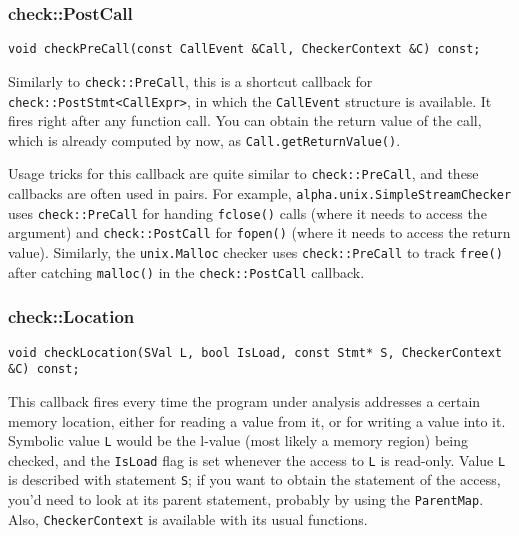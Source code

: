 \documentclass[a4paper,12pt]{article}
\newenvironment{nobr}{\begin{minipage}{\textwidth}\setlength\parskip{1em}
}{\end{minipage}\ignorespacesafterend}
\begin{document}
\begin{nobr}
\subsubsection{check::PostCall}

\begin{lstlisting}[style=cplusplus,numbers=none]
void checkPreCall(const CallEvent &Call, CheckerContext &C) const;
\end{lstlisting}

Similarly to \lstinline|check::PreCall|, this is a shortcut callback for \lstinline|check::PostStmt<CallExpr>|, in which the \lstinline|CallEvent| structure is available. It fires right after any function call. You can obtain the return value of the call, which is already computed by now, as \lstinline|Call.getReturnValue()|.
\end{nobr}

Usage tricks for this callback are quite similar to \lstinline|check::PreCall|, and these callbacks are often used in pairs. For example, \lstinline|alpha.unix.SimpleStreamChecker| uses \lstinline|check::PreCall| for handing \lstinline|fclose()| calls (where it needs to access the argument) and \lstinline|check::PostCall| for \lstinline|fopen()| (where it needs to access the return value). Similarly, the \lstinline|unix.Malloc| checker uses \lstinline|check::PreCall| to track \lstinline|free()| after catching \lstinline|malloc()| in the \lstinline|check::PostCall| callback.

\begin{nobr}
\subsubsection{check::Location}

\begin{lstlisting}[style=cplusplus,numbers=none]
void checkLocation(SVal L, bool IsLoad, const Stmt* S, CheckerContext &C) const;
\end{lstlisting}

This callback fires every time the program under analysis addresses a certain memory location, either for reading a value from it, or for writing a value into it. Symbolic value \lstinline|L| would be the l-value (most likely a memory region) being checked, and the \lstinline|IsLoad| flag is set whenever the access to \lstinline|L| is read-only. Value \lstinline|L| is described with statement \lstinline|S|; if you want to obtain the statement of the access, you'd need to look at its parent statement, probably by using the \lstinline|ParentMap|. Also, \lstinline|CheckerContext| is available with its usual functions.
\end{nobr}
\end{document}
